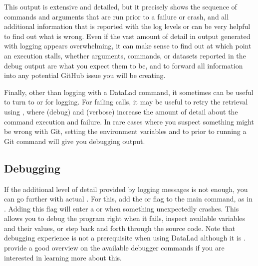 \sphinxAtStartPar
This output is extensive and detailed, but it precisely shows the sequence of commands and arguments that are run prior to a failure or crash, and all additional information that is reported with the log levels  or  can be very helpful to find out what is wrong.
Even if the vast amount of detail in output generated with  logging appears overwhelming, it can make sense to find out at which point an execution stalls, whether arguments, commands, or datasets reported in the debug output are what you expect them to be, and to forward all information into any potential GitHub issue you will be creating.

\sphinxAtStartPar
Finally, other than logging with a DataLad command, it sometimes can be useful to turn to {\hyperref[\detokenize{glossary:term-git-annex}]{}} or {\hyperref[\detokenize{glossary:term-Git}]{}} for logging.
For failing  calls, it may be useful to retry the retrieval using , where  (debug) and  (verbose) increase the amount of detail about the command execution and failure.
In rare cases where you suspect something might be wrong with Git, setting the environment variables  and  to  prior to running a Git command will give you debugging output.


\subsection{Debugging}
\label{\detokenize{basics/101-135-help:debug}}\label{\detokenize{basics/101-135-help:id3}}
\sphinxAtStartPar
If the additional level of detail provided by logging messages is not enough, you can go further with actual {\hyperref[\detokenize{glossary:term-debugging}]{}}.
For this, add the  or  flag to the main  command, as in .
Adding this flag will enter a  or  when something unexpectedly crashes.
This allows you to debug the program right when it fails, inspect available variables and their values, or step back and forth through the source code.
Note that debugging experience is not a prerequisite when using DataLad \textendash{} although it is .
 provide a good overview on the available debugger commands if you are interested in learning more about this.

\appendix

\sphinxstepscope


